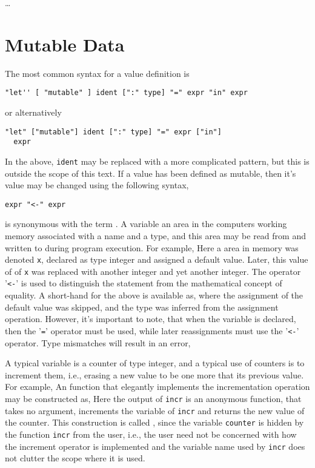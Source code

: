 \dots

\section{Mutable Data}
The most common syntax for a value definition is
\begin{lstlisting}[language=EBNF]
"let'' [ "mutable" ] ident [":" type] "=" expr "in" expr
\end{lstlisting}
or alternatively
\begin{lstlisting}[language=EBNF]
"let" ["mutable"] ident [":" type] "=" expr ["in"]
  expr
\end{lstlisting}
In the above, \texttt{ident} may be replaced with a more complicated pattern, but this is outside the scope of this text. If a value has been defined as mutable, then it's value may be changed using the following syntax,
\begin{lstlisting}[language=EBNF]
expr "<-" expr
\end{lstlisting}

 is synonymous with the term . A variable an area in the computers working memory associated with a name and a type, and this area may be read from and written to during program execution. For example,
Here a area in memory was denoted \texttt{x}, declared as type integer and assigned a default value.  Later, this value of of \texttt{x} was replaced with another integer and yet another integer. The operator '\verb|<-|' is used to distinguish the statement from the mathematical concept of equality. A short-hand for the above is available as,
where the assignment of the default value was skipped, and the type was inferred from the assignment operation. However, it's important to note, that when the variable is declared, then the '\verb|=|' operator must be used, while later reassignments must use the '\verb|<-|'  operator. Type mismatches will result in an error, 

A typical variable is a counter of type integer, and a typical use of counters is to increment them, i.e., erasing a new value to be one more that its previous value. For example,
An function that elegantly implements the incrementation operation may be constructed as,
 Here the output of \texttt{incr} is an anonymous function, that takes no argument, increments the variable of \texttt{incr} and returns the new value of the counter. This construction is called , since the variable \texttt{counter} is hidden by the function \texttt{incr} from the user, i.e., the user need not be concerned with how the increment operator is implemented and the variable name used by \texttt{incr} does not clutter the scope where it is used.

